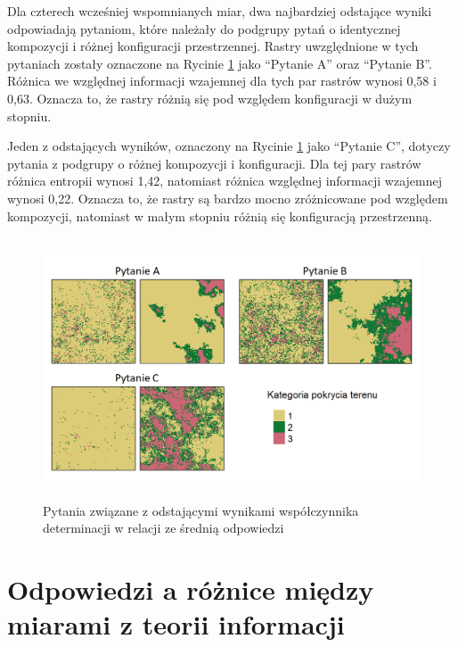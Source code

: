 \documentclass{amuthesis}
\begin{document}
Dla czterech wcześniej wspomnianych miar, dwa najbardziej odstające
wyniki odpowiadają pytaniom, które należały do podgrupy pytań o
identycznej kompozycji i różnej konfiguracji przestrzennej. Rastry
uwzględnione w tych pytaniach zostały oznaczone na Rycinie
\ref{fig-pyt_odstajace_kopia} jako ``Pytanie A'' oraz ``Pytanie B''.
Różnica we względnej informacji wzajemnej dla tych par rastrów wynosi
0,58 i 0,63. Oznacza to, że rastry różnią się pod względem konfiguracji
w dużym stopniu.

Jeden z odstających wyników, oznaczony na Rycinie
\ref{fig-pyt_odstajace_kopia} jako ``Pytanie C'', dotyczy pytania z
podgrupy o różnej kompozycji i konfiguracji. Dla tej pary rastrów
różnica entropii wynosi 1,42, natomiast różnica względnej informacji
wzajemnej wynosi 0,22. Oznacza to, że rastry są bardzo mocno
zróżnicowane pod względem kompozycji, natomiast w małym stopniu różnią
się konfiguracją przestrzenną.

\begin{figure}[t]

{\centering \includegraphics[width=5.10417in,height=3.04167in]{figures/pyt_odstajace_kopia.png}

}

\caption{\label{fig-pyt_odstajace_kopia}Pytania związane z odstającymi
wynikami współczynnika determinacji w relacji ze średnią odpowiedzi}

\end{figure}

\hypertarget{odpowiedzi-a-ruxf3ux17cnice-miux119dzy-miarami-z-teorii-informacji}{%
\section{Odpowiedzi a różnice między miarami z teorii
informacji}\label{odpowiedzi-a-ruxf3ux17cnice-miux119dzy-miarami-z-teorii-informacji}}
\end{document}
